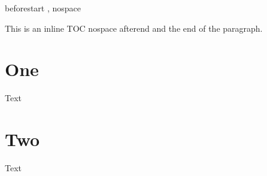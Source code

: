\documentclass{article}
\begin{document}
  {beforestart }
  {\etocname, }%
  {}
  {nospace}%


\etocinline %

\etocsettocstyle{}{} %

This is an inline TOC nospace%
\tableofcontents
afterend and the end of the paragraph.

\section{One}

Text

\section{Two}

Text
\end{document}
